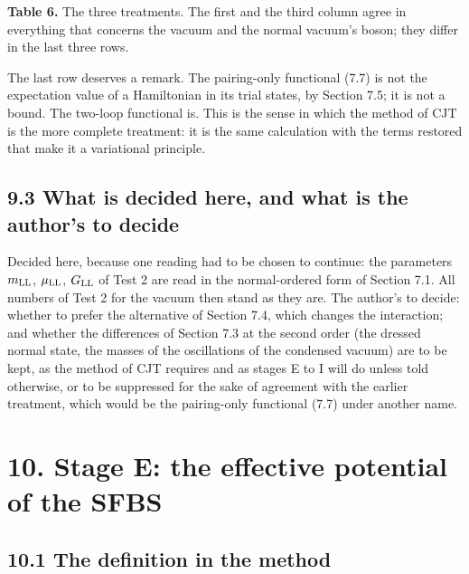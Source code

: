 \documentclass[
  10pt,
]{article}
\begin{document}
\textbf{Table 6.} The three treatments. The first and the third column
agree in everything that concerns the vacuum and the normal vacuum's
boson; they differ in the last three rows.

The last row deserves a remark. The pairing-only functional (7.7) is not
the expectation value of a Hamiltonian in its trial states, by Section
7.5; it is not a bound. The two-loop functional is. This is the sense in
which the method of CJT is the more complete treatment: it is the same
calculation with the terms restored that make it a variational
principle.

\hypertarget{what-is-decided-here-and-what-is-the-authors-to-decide}{%
\subsection{9.3 What is decided here, and what is the author's to
decide}\label{what-is-decided-here-and-what-is-the-authors-to-decide}}

Decided here, because one reading had to be chosen to continue: the
parameters \(m_{\rm LL}\), \(\mu_{\rm LL}\), \(G_{\rm LL}\) of Test 2
are read in the normal-ordered form of Section 7.1. All numbers of Test
2 for the vacuum then stand as they are. The author's to decide: whether
to prefer the alternative of Section 7.4, which changes the interaction;
and whether the differences of Section 7.3 at the second order (the
dressed normal state, the masses of the oscillations of the condensed
vacuum) are to be kept, as the method of CJT requires and as stages E to
I will do unless told otherwise, or to be suppressed for the sake of
agreement with the earlier treatment, which would be the pairing-only
functional (7.7) under another name.

\hypertarget{stage-e-the-effective-potential-of-the-sfbs}{%
\section{10. Stage E: the effective potential of the
SFBS}\label{stage-e-the-effective-potential-of-the-sfbs}}

\hypertarget{the-definition-in-the-method}{%
\subsection{10.1 The definition in the
method}\label{the-definition-in-the-method}}
\end{document}
